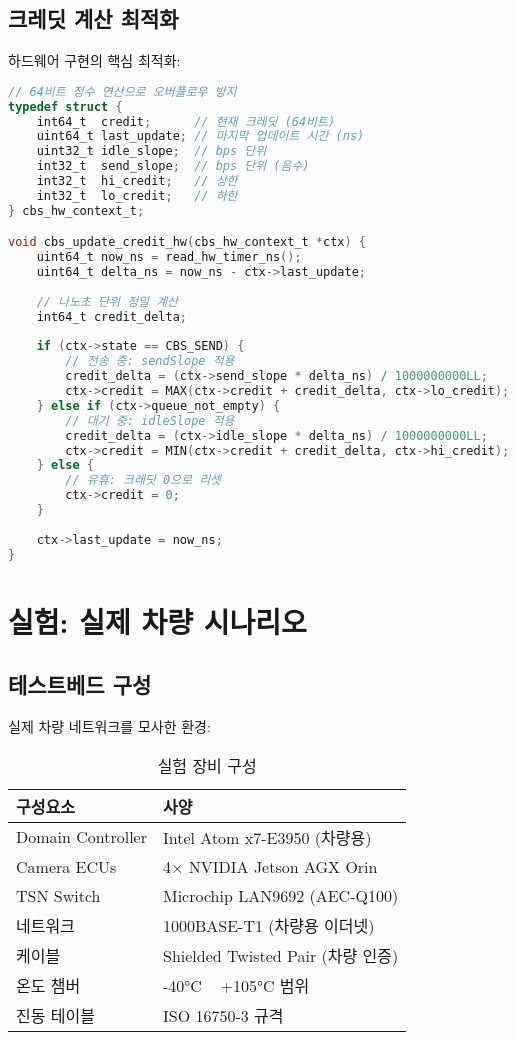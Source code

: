 \documentclass[twocolumn,10pt]{article}
\begin{document}
\subsection{크레딧 계산 최적화}

하드웨어 구현의 핵심 최적화:

\begin{lstlisting}[language=C, caption=최적화된 크레딧 업데이트 (하드웨어 로직)]
// 64비트 정수 연산으로 오버플로우 방지
typedef struct {
    int64_t  credit;      // 현재 크레딧 (64비트)
    uint64_t last_update; // 마지막 업데이트 시간 (ns)
    uint32_t idle_slope;  // bps 단위
    int32_t  send_slope;  // bps 단위 (음수)
    int32_t  hi_credit;   // 상한
    int32_t  lo_credit;   // 하한
} cbs_hw_context_t;

void cbs_update_credit_hw(cbs_hw_context_t *ctx) {
    uint64_t now_ns = read_hw_timer_ns();
    uint64_t delta_ns = now_ns - ctx->last_update;
    
    // 나노초 단위 정밀 계산
    int64_t credit_delta;
    
    if (ctx->state == CBS_SEND) {
        // 전송 중: sendSlope 적용
        credit_delta = (ctx->send_slope * delta_ns) / 1000000000LL;
        ctx->credit = MAX(ctx->credit + credit_delta, ctx->lo_credit);
    } else if (ctx->queue_not_empty) {
        // 대기 중: idleSlope 적용
        credit_delta = (ctx->idle_slope * delta_ns) / 1000000000LL;
        ctx->credit = MIN(ctx->credit + credit_delta, ctx->hi_credit);
    } else {
        // 유휴: 크레딧 0으로 리셋
        ctx->credit = 0;
    }
    
    ctx->last_update = now_ns;
}
\end{lstlisting}

\section{실험: 실제 차량 시나리오}
\label{sec:experiments}

\subsection{테스트베드 구성}

실제 차량 네트워크를 모사한 환경:

\begin{table}[h]
\centering
\caption{실험 장비 구성}
\label{tab:testbed}
\begin{tabular}{ll}
\toprule
\textbf{구성요소} & \textbf{사양} \\
\midrule
Domain Controller & Intel Atom x7-E3950 (차량용) \\
Camera ECUs & 4× NVIDIA Jetson AGX Orin \\
TSN Switch & Microchip LAN9692 (AEC-Q100) \\
네트워크 & 1000BASE-T1 (차량용 이더넷) \\
케이블 & Shielded Twisted Pair (차량 인증) \\
온도 챔버 & -40°C ~ +105°C 범위 \\
진동 테이블 & ISO 16750-3 규격 \\
\bottomrule
\end{tabular}
\end{table}
\end{document}
